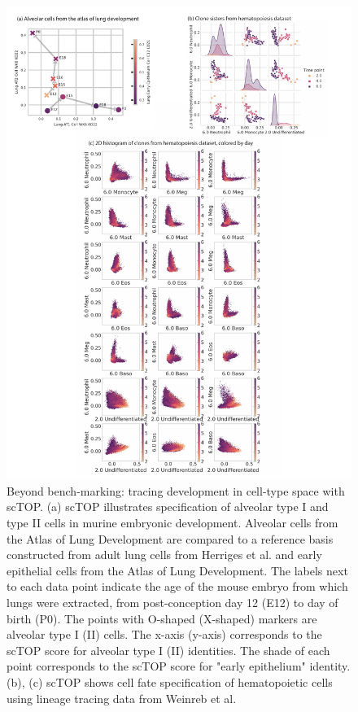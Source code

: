 \documentclass[aps,superscriptaddress, notitlepage,longbibliography]{revtex4-1}
\begin{document}
\begin{figure}
	\centering
		\includegraphics[scale=0.5]{figs/fig4.pdf}
	\caption{Beyond bench-marking: tracing development in cell-type space with scTOP. (a) scTOP illustrates specification of alveolar type I and type II cells in murine embryonic development. Alveolar cells from the Atlas of Lung Development are compared to a reference basis constructed from adult lung cells from Herriges et al. and early epithelial cells from the Atlas of Lung Development. The labels next to each data point indicate the age of the mouse embryo from which lungs were extracted, from post-conception day 12 (E12) to day of birth (P0). The points with O-shaped (X-shaped) markers are alveolar type I (II) cells. The x-axis (y-axis) corresponds to the scTOP score for alveolar type I (II) identities. The shade of each point corresponds to the scTOP score for "early epithelium" identity. (b), (c) scTOP shows cell fate specification of hematopoietic cells using lineage tracing data from Weinreb et al.}
	\label{FIG:4}
\end{figure}
\end{document}
